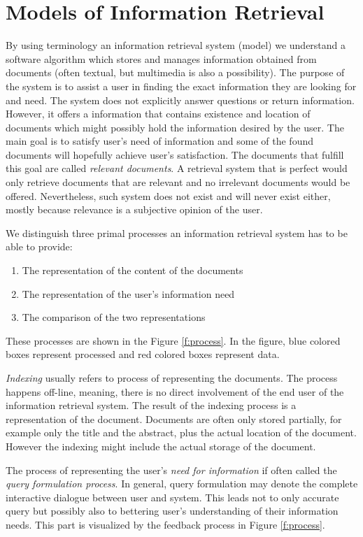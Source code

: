 \documentclass[10pt ,english,a4paper]{article}
\begin{document}
\section{Models of Information Retrieval} \label{models}

By using terminology an information retrieval system (model) we understand a software algorithm which stores and manages information obtained from documents (often textual, but multimedia is also a possibility). The purpose of the system is to assist a user in finding the exact information they are looking for and need. The system does not explicitly answer questions or return information. However, it offers a information that contains existence and location of documents which might possibly hold the information desired by the user. The main goal is to satisfy user's need of information and some of the found documents will hopefully achieve user's satisfaction. The documents that fulfill this goal are called \emph{relevant documents}. A retrieval system that is perfect would only retrieve documents that are relevant and no irrelevant documents would be offered. Nevertheless, such system does not exist and will never exist either, mostly because relevance is a subjective opinion of the user.

We distinguish three primal processes an information retrieval system has to be able to provide:
\begin{enumerate}
\item The representation of the content of the documents
\item The representation of the user's information need
\item The comparison of the two representations
\end{enumerate}

These processes are shown in the Figure \ref{f:process}. In the figure, blue colored boxes represent processed and red colored boxes represent data.

\emph{Indexing} usually refers to process of representing the documents. The process happens off-line, meaning, there is no direct involvement of the end user of the information retrieval system. The result of the indexing process is a representation of the document. Documents are often only stored partially, for example only the title and the abstract, plus the actual location of the document. However the indexing might include the actual storage of the document.

The process of representing the user's \emph{need for information} if often called the \emph{query formulation process}. In general, query formulation may denote the complete interactive dialogue between user and system. This leads not to only accurate query but possibly also to bettering user's understanding of their information needs. This part is visualized by the feedback process in Figure \ref{f:process}.
\end{document}
